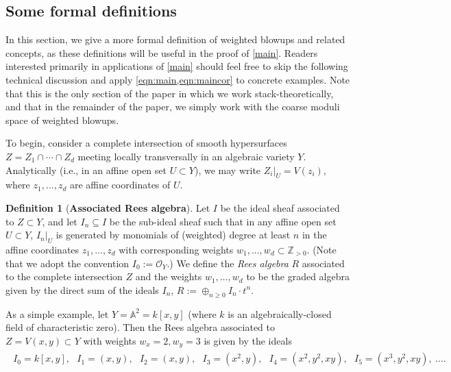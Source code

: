 \documentclass[11pt,oneside,english]{article}
\numberwithin{equation}{section}
\theoremstyle{definition}
\newtheorem{definition}[theorem]{Definition}
\begin{document}
\subsection{Some formal definitions}
\label{sec:formal}
In this section, we give a more formal definition of weighted blowups and related concepts, as these definitions will be useful in the proof of \cref{main}.   Readers interested primarily in applications of \cref{main} should feel free to skip the following technical discussion and apply \cref{eqn:main,eqn:maincor} to concrete examples. Note that this is the only section of the paper in which we work stack-theoretically, and that in the remainder of the paper, we simply work with the coarse moduli space of weighted blowups.

To begin, consider a complete intersection of smooth hypersurfaces $Z = Z_1 \cap \cdots \cap Z_d$ meeting locally transversally in an algebraic variety $Y$. Analytically (i.e., in an affine open set $U \subset Y$), we may write $Z_i|_{U} = V(z_i)$, where $z_1,\dots, z_d$ are affine coordinates of $U$. 

\begin{definition}[\bf{Associated Rees algebra}]
Let $I$ be the ideal sheaf associated to $Z \subset Y$, and let $I_n \subseteq I$ be the sub-ideal sheaf such that in any affine open set $U \subset Y$, $I_n|_{U}$ is generated by monomials of (weighted) degree at least $n$ in the affine coordinates $z_1,\dots, z_d$ with corresponding weights $w_1,...,w_d \subset \mathbb Z_{>0}$. (Note that we adopt the convention $I_0 := \mathcal O_Y$.) We define the \emph{Rees algebra} $R$ associated to the complete intersection $Z$ and the weights $w_1, \dots, w_d$ to be the graded algebra given by the direct sum of the ideals $I_n$, $R:= \oplus_{n\geq 0} I_n \cdot t^n$. 
\end{definition}

As a simple example, let $Y= \mathbb A^2 = k [x,y]$ (where $k$ is an algebraically-closed field of characteristic zero). Then the Rees algebra associated to $Z  = V(x,y) \subset Y$ with weights $w_x = 2, w_y = 3$ is given by the ideals
	\begin{align*}
		\begin{split}
			I_0= k[x,y], ~~~I_1 = (x,y),~~~ I_2 = (x,y),~~~ I_3 = (x^2,y),~~~I_4 = (x^2,y^2,xy), ~~~I_5 = (x^3,y^2,xy), \ \dots.
		\end{split}
	\end{align*}
\end{document}
